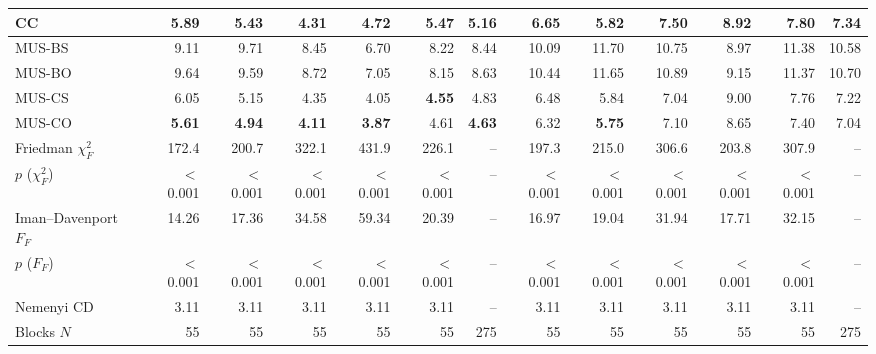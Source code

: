 \begin{table}[!htbp]
\begin{adjustbox}{max width=\linewidth}
\begin{tabular}{lrrrrrrrrrrrr}
CC & 5.89 & 5.43 & 4.31 & 4.72 & 5.47 & 5.16 & 6.65 & 5.82 & 7.50 & 8.92 & 7.80 & 7.34 \\
\midrule
MUS-BS & 9.11 & 9.71 & 8.45 & 6.70 & 8.22 & 8.44 & 10.09 & 11.70 & 10.75 & 8.97 & 11.38 & 10.58 \\
MUS-BO & 9.64 & 9.59 & 8.72 & 7.05 & 8.15 & 8.63 & 10.44 & 11.65 & 10.89 & 9.15 & 11.37 & 10.70 \\
MUS-CS & 6.05 & 5.15 & 4.35 & 4.05 & \textbf{4.55} & 4.83 & 6.48 & 5.84 & 7.04 & 9.00 & 7.76 & 7.22 \\
MUS-CO & \textbf{5.61} & \textbf{4.94} & \textbf{4.11} & \textbf{3.87} & 4.61 & \textbf{4.63} & 6.32 & \textbf{5.75} & 7.10 & 8.65 & 7.40 & 7.04 \\
\midrule
Friedman $\chi^2_F$ & 172.4 & 200.7 & 322.1 & 431.9 & 226.1 & -- & 197.3 & 215.0 & 306.6 & 203.8 & 307.9 & -- \\
$p$ ($\chi^2_F$) & $<$0.001 & $<$0.001 & $<$0.001 & $<$0.001 & $<$0.001 & -- & $<$0.001 & $<$0.001 & $<$0.001 & $<$0.001 & $<$0.001 & -- \\
Iman--Davenport $F_F$ & 14.26 & 17.36 & 34.58 & 59.34 & 20.39 & -- & 16.97 & 19.04 & 31.94 & 17.71 & 32.15 & -- \\
$p$ ($F_F$) & $<$0.001 & $<$0.001 & $<$0.001 & $<$0.001 & $<$0.001 & -- & $<$0.001 & $<$0.001 & $<$0.001 & $<$0.001 & $<$0.001 & -- \\
Nemenyi CD & 3.11 & 3.11 & 3.11 & 3.11 & 3.11 & -- & 3.11 & 3.11 & 3.11 & 3.11 & 3.11 & -- \\
Blocks $N$ & 55 & 55 & 55 & 55 & 55 & 275 & 55 & 55 & 55 & 55 & 55 & 275 \\
\bottomrule
\end{tabular}
\end{adjustbox}
\end{table}
